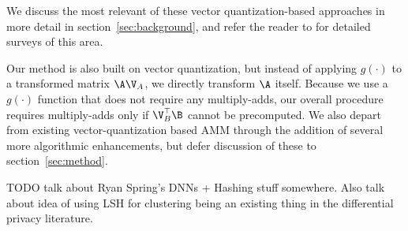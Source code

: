 We discuss the most relevant of these vector quantization-based approaches in more detail in section~\ref{sec:background}, and refer the reader to \cite{learningToHashSurvey, hashingSimilaritySurvey} for detailed surveys of this area. %

Our method is also built on vector quantization, but instead of applying $g(\cdot)$ to a transformed matrix $\A \V_A$, we directly transform $\A$ itself. Because we use a $g(\cdot)$ function that does not require any multiply-adds, our overall procedure requires multiply-adds only if $\V_B^\top \B$ cannot be precomputed. We also depart from existing vector-quantization based AMM through the addition of several more algorithmic enhancements, but defer discussion of these to section~\ref{sec:method}.

TODO talk about Ryan Spring's DNNs + Hashing stuff somewhere. Also talk about idea of using LSH for clustering being an existing thing in the differential privacy literature.




